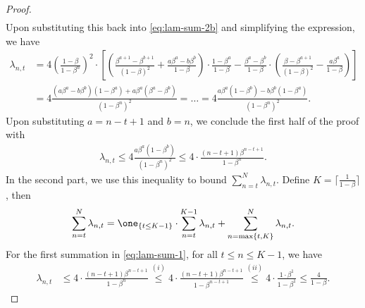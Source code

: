 \begin{proof}
\begin{align*}
\end{align*}
Upon substituting this back into \eqref{eq:lam-sum-2b} and simplifying the expression, we have
\begin{align*}
    \lambda_{n,t}
    &= 4\left(\frac{1-\beta}{1-\beta^n}\right)^2 \cdot \left[
    \left( \frac{\beta^{a+1} - \beta^{b+1}}{(1-\beta)^2} + \frac{a\beta^{a}-b\beta^{b}}{1-\beta} \right) \cdot \frac{1-\beta^a}{1-\beta}
    - \frac{\beta^a-\beta^b}{1-\beta} \cdot \left(\frac{\beta-\beta^{a+1}}{(1-\beta)^2} - \frac{a\beta^a}{1-\beta}\right)
    \right] \\
    &= 4\frac{(a\beta^a-b\beta^b)(1-\beta^a) + a\beta^a(\beta^a-\beta^b)}{(1-\beta^n)^2} 
    = \ldots 
    = 4\frac{a\beta^a(1-\beta^b) - b\beta^b(1-\beta^a)}{(1-\beta^n)^2}.
\end{align*}
Upon substituting $a=n-t+1$ and $b=n$, we conclude the first half of the proof with 
\begin{align*}
    \lambda_{n,t} 
    \le 4\frac{a\beta^a(1-\beta^b)}{(1-\beta^n)^2}
    \le 4\cdot \frac{(n-t+1)\beta^{n-t+1}}{1-\beta^n}.
\end{align*}
In the second part, we use this inequality to bound $\sum_{n=t}^N\lambda_{n,t}$. Define $K=\lceil \frac{1}{1-\beta}\rceil$, then
\begin{align}
    \sum_{n=t}^N \lambda_{n,t}
    = \one_{\{t\le K-1\}}\cdot \sum_{n=t}^{K-1} \lambda_{n,t} + \sum_{n=\max\{t,K\}}^N \lambda_{n,t}.
    \label{eq:lam-sum-1}
\end{align}
For the first summation in \eqref{eq:lam-sum-1}, for all $t\le n\le K-1$, we have
\begin{align*}
    \lambda_{n,t}
    &\le 4\cdot \frac{(n-t+1)\beta^{n-t+1}}{1-\beta^n} 
    \stackrel{(i)}{\le} 4\cdot \frac{(n-t+1)\beta^{n-t+1}}{1-\beta^{n-t+1}}
    \stackrel{(ii)}{\le} 4\cdot \frac{1\cdot \beta^1}{1-\beta^1} \le \frac{4}{1-\beta}.
\end{align*}

\end{proof}
